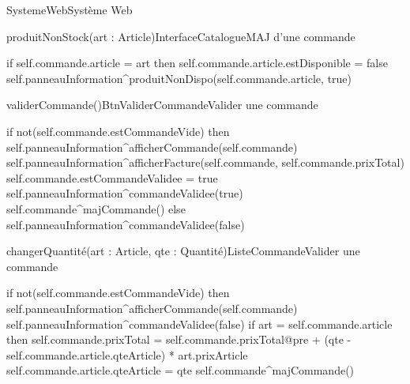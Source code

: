 \begin{OM}{SystemeWeb}{Système Web}
    \begin{OMOperation}{produitNonStock(art : Article)}{InterfaceCatalogue}{MAJ d'une commande}
        \begin{OMMessages}
        \end{OMMessages}
        \OMNoPre
        \begin{OMPost}
if self.commande.article = art then
    self.commande.article.estDisponible = false
    self.panneauInformation^produitNonDispo(self.commande.article, true)
        \end{OMPost}
    \end{OMOperation}

    \begin{OMOperation}{validerCommande()}{BtnValiderCommande}{Valider une commande}
        \begin{OMMessages}
        \end{OMMessages}
        \OMNoPre
        \begin{OMPost}
if not(self.commande.estCommandeVide) then
    self.panneauInformation^afficherCommande(self.commande)
    self.panneauInformation^afficherFacture(self.commande, self.commande.prixTotal)
    self.commande.estCommandeValidee = true
    self.panneauInformation^commandeValidee(true)
    self.commande^majCommande()
else
    self.panneauInformation^commandeValidee(false)
        \end{OMPost}
    \end{OMOperation}

    \begin{OMOperation}{changerQuantité(art : Article, qte : Quantité)}{ListeCommande}{Valider une commande}
        \begin{OMMessages}
        \end{OMMessages}
        \OMNoPre
        \begin{OMPost}
if not(self.commande.estCommandeVide) then
    self.panneauInformation^afficherCommande(self.commande)
    self.panneauInformation^commandeValidee(false)
    if art = self.commande.article then
        self.commande.prixTotal = self.commande.prixTotal@pre + (qte - self.commande.article.qteArticle) * art.prixArticle
        self.commande.article.qteArticle = qte
        self.commande^majCommande()
        \end{OMPost}
    \end{OMOperation}


\end{OM}
